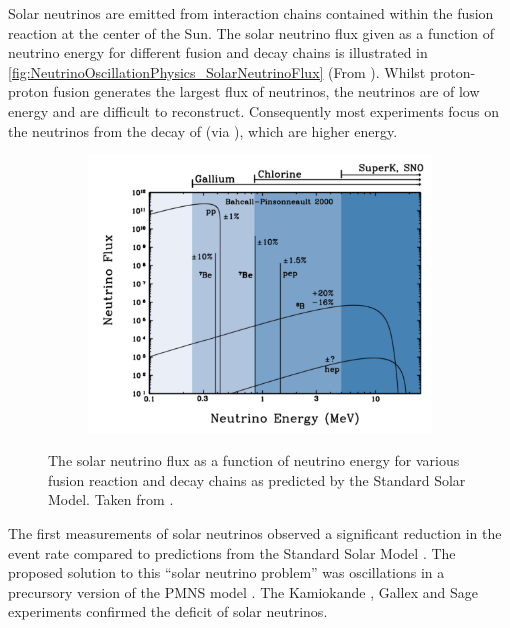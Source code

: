 Solar neutrinos are emitted from interaction chains contained within the fusion reaction at the center of the Sun. The solar neutrino flux given as a function of neutrino energy for different fusion and decay chains is illustrated in \autoref{fig:NeutrinoOscillationPhysics_SolarNeutrinoFlux} (From \cite{Bellerive2004-ur}). Whilst proton-proton fusion generates the largest flux of neutrinos, the neutrinos are of low energy and are difficult to reconstruct. Consequently most experiments focus on the neutrinos from the decay of  (via ), which are higher energy.

\begin{figure}[h]
  \begin{subfigure}[t]{0.80\textwidth}
    \includegraphics[width=\textwidth, trim={0mm 0mm 0mm 0mm}, clip,page=1]{Figures/Theory/SolarNeutrinoFlux.pdf}
  \end{subfigure}
  \caption{The solar neutrino flux as a function of neutrino energy for various fusion reaction and decay chains as predicted by the Standard Solar Model. Taken from \cite{Bellerive2004-ur}.}
  \label{fig:NeutrinoOscillationPhysics_SolarNeutrinoFlux}
\end{figure}

The first measurements of solar neutrinos observed a significant reduction in the event rate compared to predictions from the Standard Solar Model \cite{PhysRevLett.20.1205, Vinyoles2017-vv}. The proposed solution to this ``solar neutrino problem'' was  oscillations in a precursory version of the PMNS model \cite{Gribov1969-xi}. The Kamiokande \cite{PhysRevLett.63.16}, Gallex \cite{Hampel1999-of} and Sage \cite{PhysRevC.60.055801} experiments confirmed the  deficit of solar neutrinos.

